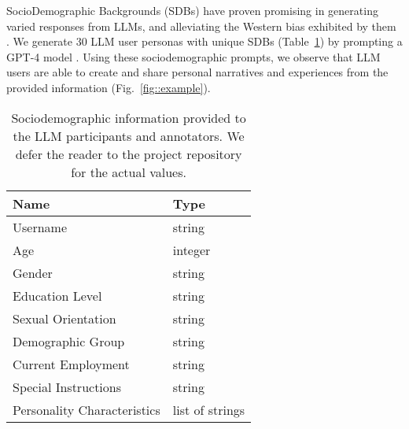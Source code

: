 SocioDemographic Backgrounds (SDBs) have proven promising in generating varied responses from LLMs, and alleviating the Western bias exhibited by them \cite{burton2024large}. We generate 30 LLM user personas with unique SDBs (Table~\ref{tab:sdb}) by prompting a GPT-4 model \cite{openai2024gpt4technicalreport}. Using these sociodemographic prompts, we observe that LLM users are able to create and share personal narratives and experiences from the provided information (Fig.~\ref{fig::example}). 

\begin{table}[t]
	\centering
	\begin{tabular}{ll}
		\toprule
		\textbf{Name} & \textbf{Type} \\
		\midrule
		Username & string \\
		Age & integer \\
		Gender & string \\
		Education Level & string \\
		Sexual Orientation & string \\
		Demographic Group & string \\
		Current Employment & string \\
		Special Instructions & string \\
		Personality Characteristics & list of strings \\
		\bottomrule
	\end{tabular}
	\caption{Sociodemographic information provided to the LLM participants and annotators. We defer the reader to the project repository for the actual values.\analysislink}
	\label{tab:sdb}
\end{table}
